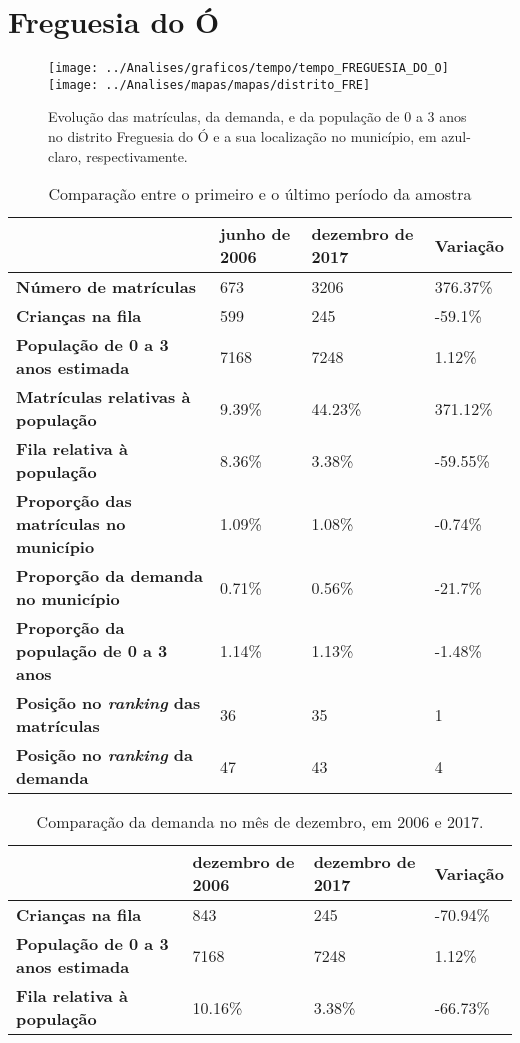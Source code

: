 \section{Freguesia do Ó}
\begin{figure}[H]
\centering
\texttt{[image: ../Analises/graficos/tempo/tempo\_FREGUESIA\_DO\_O]}
\texttt{[image: ../Analises/mapas/mapas/distrito\_FRE]}
\caption{Evolução das matrículas, da demanda, e da população de 0 a 3 anos no distrito Freguesia do Ó e a sua localização no município, em azul-claro, respectivamente.}
\end{figure}
\begin{table}[H]
\begin{tabular}{l|l|l|l}
\textbf{}                                      & \textbf{junho de 2006}       & \textbf{dezembro de 2017}    & \textbf{Variação} \\ \hline
\textbf{Número de matrículas}                  & 673 & 3206 & 376.37\% \\ \hline
\textbf{Crianças na fila}                      & 599 & 245 & -59.1\% \\ \hline
\textbf{População de 0 a 3 anos estimada}      & 7168 & 7248 & 1.12\% \\ \hline
\textbf{Matrículas relativas à população}      & 9.39\% & 44.23\% & 371.12\% \\ \hline
\textbf{Fila relativa à população}             & 8.36\% & 3.38\% & -59.55\% \\ \hline
\textbf{Proporção das matrículas no município} & 1.09\% & 1.08\% & -0.74\% \\ \hline
\textbf{Proporção da demanda no município}     & 0.71\% & 0.56\% & -21.7\% \\ \hline
\textbf{Proporção da população de 0 a 3 anos}  & 1.14\% & 1.13\% & -1.48\% \\ \hline
\textbf{Posição no \textit{ranking} das matrículas}     & 36 & 35 & 1 \\ \hline
\textbf{Posição no \textit{ranking} da demanda}         & 47 & 43 & 4 \\ 
\end{tabular}
\caption{Comparação entre o primeiro e o último período da amostra}
\end{table}
\begin{table}[H]
\begin{tabular}{l|l|l|l}
\textbf{}                                 & \textbf{dezembro de 2006} & \textbf{dezembro de 2017} & \textbf{Variação} \\ \hline
\textbf{Crianças na fila}                      & 843 & 245 & -70.94\% \\ \hline
\textbf{População de 0 a 3 anos estimada}      & 7168 & 7248 & 1.12\% \\ \hline
\textbf{Fila relativa à população}             & 10.16\% & 3.38\% & -66.73\% \\
\end{tabular}
\caption{Comparação da demanda no mês de dezembro, em 2006 e 2017.}
\end{table}
